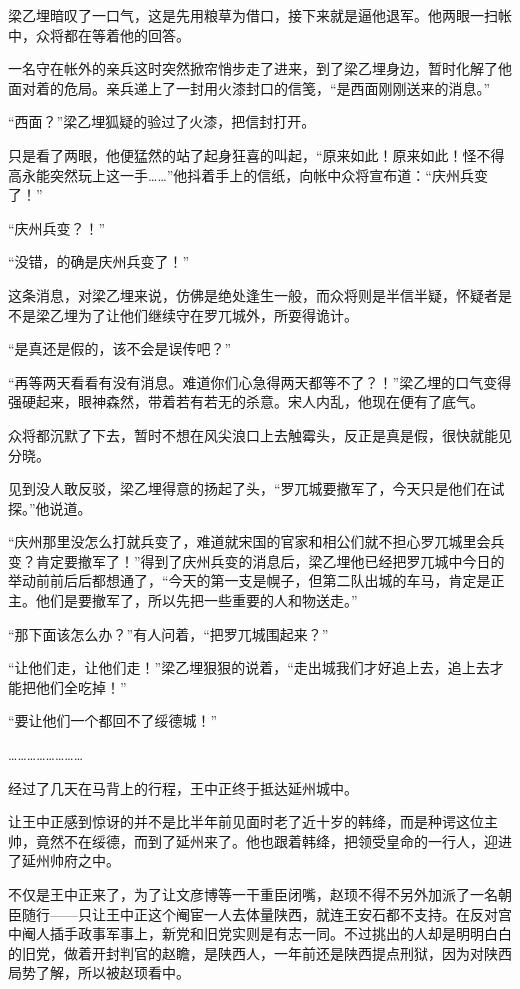 梁乙埋暗叹了一口气，这是先用粮草为借口，接下来就是逼他退军。他两眼一扫帐中，众将都在等着他的回答。

一名守在帐外的亲兵这时突然掀帘悄步走了进来，到了梁乙埋身边，暂时化解了他面对着的危局。亲兵递上了一封用火漆封口的信笺，“是西面刚刚送来的消息。”

“西面？”梁乙埋狐疑的验过了火漆，把信封打开。

只是看了两眼，他便猛然的站了起身狂喜的叫起，“原来如此！原来如此！怪不得高永能突然玩上这一手……”他抖着手上的信纸，向帐中众将宣布道：“庆州兵变了！”

“庆州兵变？！”

“没错，的确是庆州兵变了！”

这条消息，对梁乙埋来说，仿佛是绝处逢生一般，而众将则是半信半疑，怀疑者是不是梁乙埋为了让他们继续守在罗兀城外，所耍得诡计。

“是真还是假的，该不会是误传吧？”

“再等两天看看有没有消息。难道你们心急得两天都等不了？！”梁乙埋的口气变得强硬起来，眼神森然，带着若有若无的杀意。宋人内乱，他现在便有了底气。

众将都沉默了下去，暂时不想在风尖浪口上去触霉头，反正是真是假，很快就能见分晓。

见到没人敢反驳，梁乙埋得意的扬起了头，“罗兀城要撤军了，今天只是他们在试探。”他说道。

“庆州那里没怎么打就兵变了，难道就宋国的官家和相公们就不担心罗兀城里会兵变？肯定要撤军了！”得到了庆州兵变的消息后，梁乙埋他已经把罗兀城中今日的举动前前后后都想通了，“今天的第一支是幌子，但第二队出城的车马，肯定是正主。他们是要撤军了，所以先把一些重要的人和物送走。”

“那下面该怎么办？”有人问着，“把罗兀城围起来？”

“让他们走，让他们走！”梁乙埋狠狠的说着，“走出城我们才好追上去，追上去才能把他们全吃掉！”

“要让他们一个都回不了绥德城！”

……………………

经过了几天在马背上的行程，王中正终于抵达延州城中。

让王中正感到惊讶的并不是比半年前见面时老了近十岁的韩绛，而是种谔这位主帅，竟然不在绥德，而到了延州来了。他也跟着韩绛，把领受皇命的一行人，迎进了延州帅府之中。

不仅是王中正来了，为了让文彦博等一干重臣闭嘴，赵顼不得不另外加派了一名朝臣随行——只让王中正这个阉宦一人去体量陕西，就连王安石都不支持。在反对宫中阉人插手政事军事上，新党和旧党实则是有志一同。不过挑出的人却是明明白白的旧党，做着开封判官的赵瞻，是陕西人，一年前还是陕西提点刑狱，因为对陕西局势了解，所以被赵顼看中。

